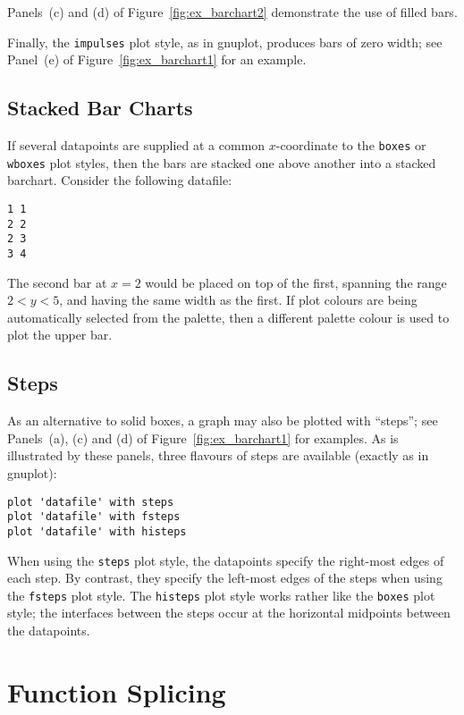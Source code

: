 \documentclass[a4paper,onecolumn,11pt]{book}
\begin{document}
\noindent Panels~(c) and (d) of Figure~\ref{fig:ex_barchart2} demonstrate the
use of filled bars.

Finally, the \texttt{impulses} plot style, as in gnuplot, produces bars of zero
width; see Panel~(e) of Figure~\ref{fig:ex_barchart1} for an example.

\subsection{Stacked Bar Charts}

If several datapoints are supplied at a common $x$-coordinate to the
\texttt{boxes} or \texttt{wboxes} plot styles, then the bars are stacked one
above another into a stacked barchart. Consider the following datafile:

\begin{verbatim} 
1 1
2 2
2 3
3 4
\end{verbatim}

The second bar at $x=2$ would be placed on top of the first, spanning the range
$2<y<5$, and having the same width as the first. If plot colours are being
automatically selected from the palette, then a different palette colour is
used to plot the upper bar.

\subsection{Steps}

As an alternative to solid boxes, a graph may also be plotted with ``steps'';
see Panels~(a), (c) and (d) of Figure~\ref{fig:ex_barchart1} for examples. As
is illustrated by these panels, three flavours of steps are available (exactly
as in gnuplot):

\begin{verbatim}
plot 'datafile' with steps 
plot 'datafile' with fsteps 
plot 'datafile' with histeps
\end{verbatim}

When using the \texttt{steps} plot style, the datapoints specify the right-most
edges of each step. By contrast, they specify the left-most edges of the steps
when using the \texttt{fsteps} plot style. The \texttt{histeps} plot style
works rather like the \texttt{boxes} plot style; the interfaces between the
steps occur at the horizontal midpoints between the datapoints.

\section{Function Splicing}
\end{document}
